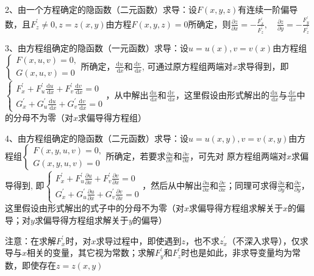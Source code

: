 2、由一个方程确定的隐函数（二元函数）求导：设$F(x, y, z)$有连续一阶偏导数，且$F_{z}^{\prime} \neq 0, z=z(x, y)$由方程$F(x, y, z)=0$所确定，则$\frac{\partial z}{\partial x}=-\frac{F_{x}^{\prime}}{F_{z}^{\prime}}, \quad \frac{\partial z}{\partial y}=-\frac{F_{y}^{\prime}}{F_{z}^{\prime}}$

3、由方程组确定的隐函数（一元函数）求导：设$u=u(x), v=v(x)$由方程组$\left\{\begin{array}{l}F(x, u, v)=0,  \\ G(x, u, v)=0\end{array}\right. $所确定，$\frac{\mathrm{d} u}{\mathrm{~d} x}$和$\frac{\mathrm{d} v}{\mathrm{~d} x}$, 可通过原方程组两端对$x$求导得到，即$\left\{\begin{array}{l} F_{x}^{\prime}+F_{u}^{\prime} \frac{\mathrm{d} u}{\mathrm{~d} x}+F_{v}^{\prime} \frac{\mathrm{d} v}{\mathrm{~d} x}=0 \\ G_{x}^{\prime}+G_{u}^{\prime} \frac{\mathrm{d} u}{\mathrm{~d} x}+G_{v}^{\prime} \frac{\mathrm{d} v}{\mathrm{~d} x}=0 \end{array}\right.$，从中解出$\frac{\mathrm{d} u}{\mathrm{~d} x}$和$\frac{\mathrm{d} v}{\mathrm{~d} x}$，这里假设由形式解出的$\frac{\mathrm{d} u}{\mathrm{~d} x}$与$\frac{\mathrm{d} v}{\mathrm{~d} x}$中的分母不为零（对$x$求偏导得方程组）

4、由方程组确定的隐函数（二元函数）求导：设$u=u(x, y), v=v(x, y)$由方程组$\left\{\begin{array}{l}F(x, y, u, v)=0, \\ G(x, y, u, v)=0\end{array}\right.$所确定，若要求$\frac{\partial u}{\partial x}$和$\frac{\partial v}{\partial x}$，可先对 原方程组两端对$x$求偏导得到, 即$\left\{\begin{array}{l} F_{x}^{\prime}+F_{u}^{\prime} \frac{\partial u}{\partial x}+F_{v}^{\prime} \frac{\partial v}{\partial x}=0 \\ G_{x}^{\prime}+G_{u}^{\prime} \frac{\partial u}{\partial x}+G_{v}^{\prime} \frac{\partial v}{\partial x}=0 \end{array}\right.$，然后从中解出$\frac{\partial u}{\partial x}$和$\frac{\partial v}{\partial x}$；同理可求得$\frac{\partial u}{\partial y}$和$\frac{\partial v}{\partial y}$，这里假设由形式解出的式子中的分母不为零（对$x$求偏导得方程组求解关于$x$的偏导；对$y$求偏导得方程组求解关于$y$的偏导）

注意：在求解$F^{\prime}_x$时，对$x$求导过程中，即使遇到$z$，也不求$z^{\prime}_x$（不深入求导），仅求导与$x$相关的变量，其它视为常数；求解$F^{\prime}_y$和$F^{\prime}_z$时也是如此，非求导变量均为常数，即使存在$z=z(x, y)$

